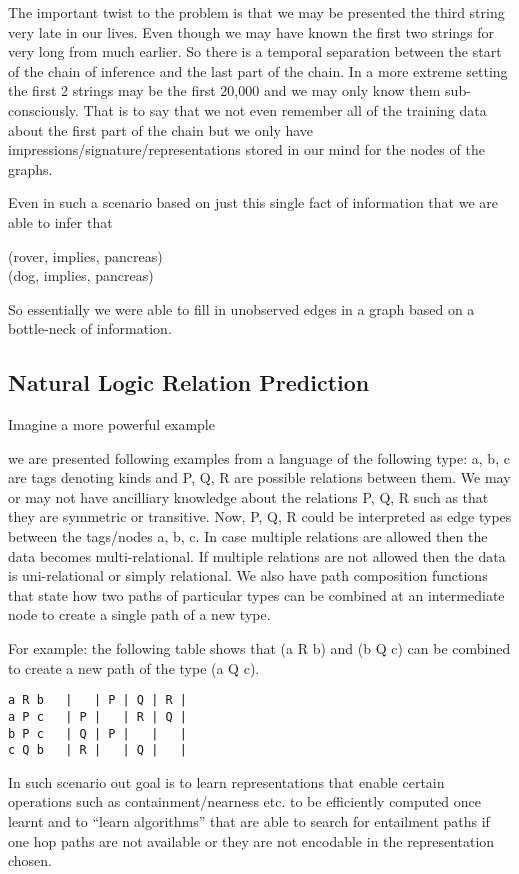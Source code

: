 \documentclass[11pt]{article}
\begin{document}
The important twist to the problem is that we may be presented the
third string very late in our lives.  Even though we may have known
the first two strings for very long from much earlier.  So there is a
temporal separation between the start of the chain of inference and
the last part of the chain.  In a more extreme setting the first 2
strings may be the first 20,000 and we may only know them
sub-consciously.  That is to say that we not even remember all of the
training data about the first part of the chain but we only have
impressions/signature/representations stored in our mind for the nodes
of the graphs.

Even in such a scenario based on just this single fact of information
that we are able to infer that

(rover, implies, pancreas) \\
(dog, implies, pancreas)

So essentially we were able to fill in unobserved edges in a
graph based on a bottle-neck of information.

\subsection{Natural Logic Relation Prediction}
\label{sec:natur-logic-relat}
Imagine a more powerful example

we are presented following examples from a language of the following type:
a, b, c are tags denoting kinds and P, Q, R are possible relations
between them. We may or may not have ancilliary knowledge about the
relations P, Q, R such as that they are symmetric or transitive.
Now, P, Q, R could be interpreted as edge types between the tags/nodes
a, b, c. In case multiple relations are allowed then the data becomes
multi-relational. If multiple relations are not allowed then the data
is uni-relational or simply relational. We also have path composition
functions that state how two paths of particular types can be combined
at an intermediate node to create a single path of a new type.

For example: the following table shows that (a R b) and (b Q c) can be
combined to create a new path of the type (a Q c).
\begin{verbatim}
a R b   |   | P | Q | R |
a P c   | P |   | R | Q |
b P c   | Q | P |   |   |
c Q b   | R |   | Q |   |
\end{verbatim}


In such scenario out goal is to learn representations that enable
certain operations such as containment/nearness etc. to be efficiently
computed once learnt and to ``learn algorithms'' that are able to
search for entailment paths if one hop paths are not available or they
are not encodable in the representation chosen.
\end{document}
